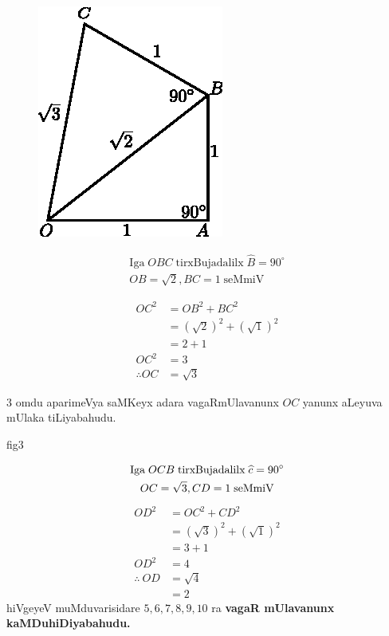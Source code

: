 \begin{figure}
\includegraphics{src/figure/m_051.eps}
\end{figure}

\begin{gather*}
\text{Iga}\;  OBC \;\text{tirxBujadalilx}\;  \widehat{B} = 90^{\circ}\\
OB=\sqrt{2}, BC = 1 \;\text{seMmiV}
\end{gather*}

\begin{align*}
OC^2 &= OB^2+BC^2\\
&= (\sqrt{2})^2+(\sqrt{1})^2\\
&=2+1\\
OC^2&= 3\\
\therefore OC &= \sqrt{3}
\end{align*}

$3$ omdu aparimeVya saMKeyx adara vagaRmUlavanunx $OC$ yanunx aLeyuva mUlaka tiLiyabahudu.
\begin{center}
{\rm fig3}
\end{center}
\begin{gather*}
\text{Iga}\; OCB \; \text{tirxBujadalilx}\; \widehat{c} = 90\degree\\
OC=\sqrt{3}, CD = 1 \;\text{seMmiV}
\end{gather*}
\begin{align*}
OD^2 &= OC^2+CD^2\\
&= (\sqrt{3})^2+(\sqrt{1})^2\\
&=3+1\\
OD^2&= 4\\
\therefore\ OD &= \sqrt{4}\\
&= 2
\end{align*}
hiVgeyeV muMduvarisidare $5,6,7,8,9,10$ ra {\bf vagaR mUlavanunx kaMDuhiDiyabahudu.}

